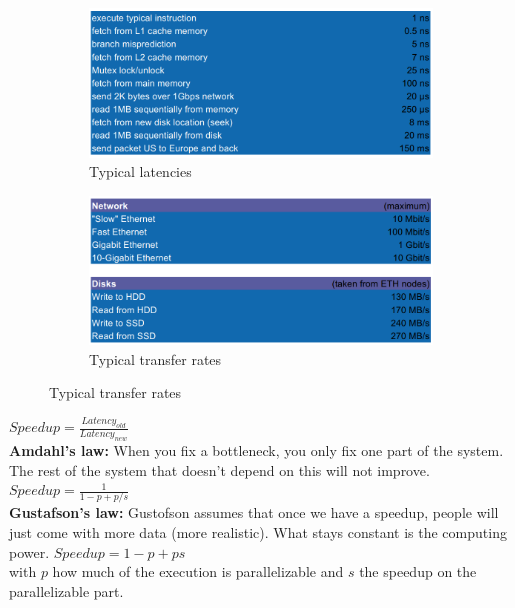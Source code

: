 \documentclass[11pt,oneside,a4paper]{article}
\begin{document}
{\begin{figure}[hb!]
	\centering
	\begin{subfigure}[t]{.5\textwidth}
		\centering
		\includegraphics[width=1\linewidth]{figures/performance_latencies}
		\caption{Typical latencies}
	\end{subfigure}%
	\begin{subfigure}[t]{.5\textwidth}
		\centering
		\includegraphics[width=1\linewidth]{figures/performance_throughput}
		\caption{Typical transfer rates}
	\end{subfigure}
\end{figure}

$Speedup = \frac{Latency_{old}}{Latency_{new}}$\\

\textbf{Amdahl's law:} When you fix a bottleneck, you only fix one part of the system. The rest of the system that doesn't depend on this will not improve. $Speedup = \frac{1}{1-p+p/s}$\\

\textbf{Gustafson's law:} Gustofson assumes that once we have a speedup, people will just come with more data (more realistic). What stays constant is the computing power. $Speedup = 1-p+ps$\\

with $p$ how much of the execution is parallelizable and $s$ the speedup on the parallelizable part.\\

}
\end{document}
